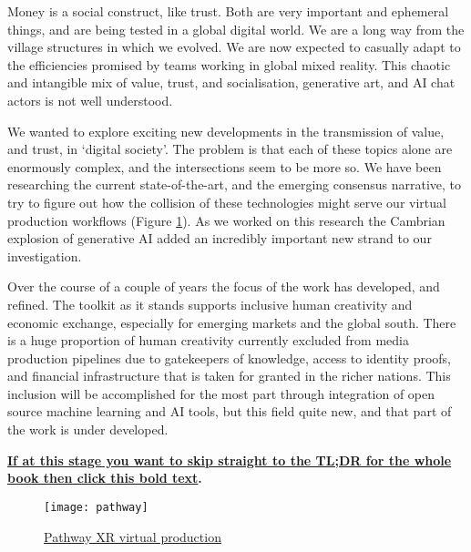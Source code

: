 Money is a social construct, like trust. Both are very important and ephemeral things, and are being tested in a global digital world.  We are a long way from the village structures in which we evolved. We are now expected to casually adapt to the efficiencies promised by teams working in global mixed reality. This chaotic and intangible mix of value, trust, and socialisation, generative art, and AI chat actors is not well understood.\par
We wanted to explore exciting new developments in the transmission of value, and trust, in `digital society'. The problem is that each of these topics alone are enormously complex, and the intersections seem to be more so. We have been researching the current state-of-the-art, and the emerging consensus narrative, to try to figure out how the collision of these technologies might serve our virtual production workflows (Figure \ref{fig:pathway}). As we worked on this research the Cambrian explosion of generative AI added an incredibly important new strand to our investigation.\par
Over the course of a couple of years the focus of the work has developed, and refined. The toolkit as it stands supports inclusive human creativity and economic exchange, especially for emerging markets and the global south. There is a huge proportion of human creativity currently excluded from media production pipelines due to gatekeepers of knowledge, access to identity proofs, and financial infrastructure that is taken for granted in the richer nations. This inclusion will be accomplished for the most part through integration of open source machine learning and AI tools, but this field quite new, and that part of the work is under developed.\par

\textbf{\hyperref[sec:tldr]{If at this stage you want to skip straight to the TL;DR for the whole book then click this bold text}.}\par
\begin{figure}
  \centering
   \texttt{[image: pathway]}
 \caption{\href{https://www.pathwayxr.studio/}{Pathway XR virtual production}}
    \label{fig:pathway}
\end{figure}

